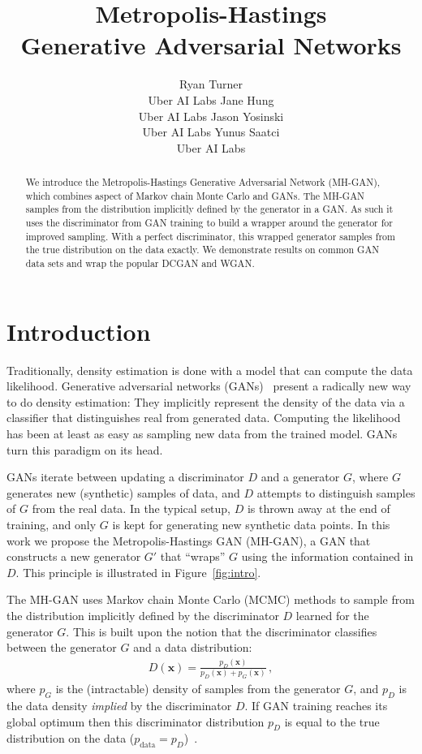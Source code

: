 \documentclass{article}
\title{Metropolis-Hastings\\Generative Adversarial Networks}
\author{
  Ryan Turner \\
  Uber AI Labs
  \And
  Jane Hung \\
  Uber AI Labs
  \And
  Jason Yosinski \\
  Uber AI Labs
  \And
  Yunus Saatci \\
  Uber AI Labs
}
\renewcommand{\vec}[1]{{\boldsymbol{\mathbf{#1}}}} %
\newcommand{\PG}{{p_G}}
\newcommand{\PD}{{p_D}}
\newcommand{\PR}{{p_{\textrm{data}}}}
\begin{document}

\maketitle

\begin{abstract}
We introduce the Metropolis-Hastings Generative Adversarial Network (MH-GAN), which combines aspect of Markov chain Monte Carlo and GANs.
The MH-GAN samples from the distribution implicitly defined by the generator in a GAN\@.
As such it uses the discriminator from GAN training to build a wrapper around the generator for improved sampling.
With a perfect discriminator, this wrapped generator samples from the true distribution on the data exactly.
We demonstrate results on common GAN data sets and wrap the popular DCGAN and WGAN\@.
\end{abstract}

\section{Introduction}

Traditionally, density estimation is done with a model that can compute the data likelihood.
Generative adversarial networks (GANs)~\citep{Goodfellow2014} present a radically new way to do density estimation:
They implicitly represent the density of the data via a classifier that distinguishes real from generated data.
Computing the likelihood has been at least as easy as sampling new data from the trained model.
GANs turn this paradigm on its head.

GANs iterate between updating a discriminator $D$ and a generator $G$, where $G$ generates new (synthetic) samples of data, and $D$ attempts to distinguish samples of $G$ from the real data.
In the typical setup, $D$ is thrown away at the end of training, and only $G$ is kept for generating new synthetic data points.
In this work we propose the Metropolis-Hastings GAN (MH-GAN), a GAN that constructs a new generator $G'$ that ``wraps'' $G$ using the information contained in $D$.
This principle is illustrated in Figure~\ref{fig:intro}.

The MH-GAN uses Markov chain Monte Carlo (MCMC) methods to sample from the distribution implicitly defined by the discriminator $D$ learned for the generator $G$.
This is built upon the notion that the discriminator classifies between the generator $G$ and a data distribution:
\begin{align}
  D(\vec x) = \frac{\PD(\vec x)}{\PD(\vec x) + \PG(\vec x)} \,, \label{eq:define PD}
\end{align}
where $\PG$ is the (intractable) density of samples from the generator $G$, and $\PD$ is the data density \emph{implied} by the discriminator $D$.
If GAN training reaches its global optimum then this discriminator distribution $\PD$ is equal to the true distribution on the data ($\PR = \PD$)~\citep{Goodfellow2014}.
\end{document}
